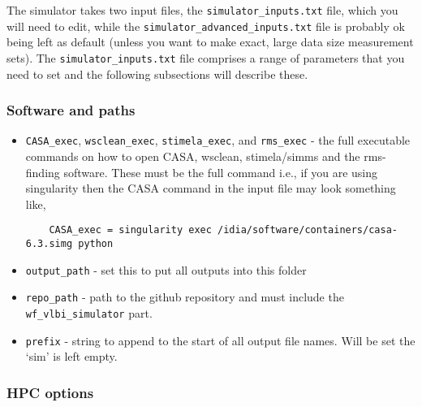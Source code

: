 \documentclass[11pt]{report_jfr}
\begin{document}
The simulator takes two input files, the \texttt{simulator\_inputs.txt} file, which you will need to edit, while the \texttt{simulator\_advanced\_inputs.txt} file is probably ok being left as default (unless you want to make exact, large data size measurement sets). The \texttt{simulator\_inputs.txt} file comprises a range of parameters that you need to set and the following subsections will describe these.

\subsubsection{Software and paths}
\begin{itemize}
	\item \texttt{CASA\_exec}, \texttt{wsclean\_exec}, \texttt{stimela\_exec}, and \texttt{rms\_exec} - the full executable commands on how to open CASA, wsclean, stimela/simms and the rms-finding software. These must be the full command i.e., if you are using singularity then the CASA command in the input file may look something like,
	\begin{lstlisting}
	CASA_exec = singularity exec /idia/software/containers/casa-6.3.simg python
	\end{lstlisting}
	\item \texttt{output\_path} - set this to put all outputs into this folder
	\item \texttt{repo\_path} - path to the github repository and must include the \texttt{wf\_vlbi\_simulator} part.
	\item \texttt{prefix} - string to append to the start of all output file names. Will be set the `sim' is left empty.
\end{itemize}

\subsubsection{HPC options}
\end{document}
